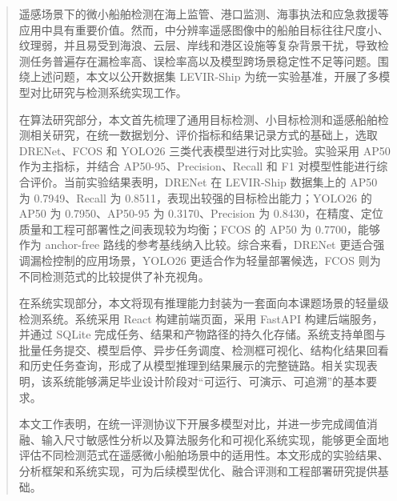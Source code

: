 

\begin{abstract}
  遥感场景下的微小船舶检测在海上监管、港口监测、海事执法和应急救援等应用中具有重要价值。然而，中分辨率遥感图像中的船舶目标往往尺度小、纹理弱，并且易受到海浪、云层、岸线和港区设施等复杂背景干扰，导致检测任务普遍存在漏检率高、误检率高以及模型跨场景稳定性不足等问题。围绕上述问题，本文以公开数据集 LEVIR-Ship 为统一实验基准，开展了多模型对比研究与检测系统实现工作。

  在算法研究部分，本文首先梳理了通用目标检测、小目标检测和遥感船舶检测相关研究，在统一数据划分、评价指标和结果记录方式的基础上，选取 DRENet、FCOS 和 YOLO26 三类代表模型进行对比实验。实验采用 AP50 作为主指标，并结合 AP50-95、Precision、Recall 和 F1 对模型性能进行综合评价。当前实验结果表明，DRENet 在 LEVIR-Ship 数据集上的 AP50 为 0.7949、Recall 为 0.8511，表现出较强的目标检出能力；YOLO26 的 AP50 为 0.7950、AP50-95 为 0.3170、Precision 为 0.8430，在精度、定位质量和工程可部署性之间表现较为均衡；FCOS 的 AP50 为 0.7700，能够作为 anchor-free 路线的参考基线纳入比较。综合来看，DRENet 更适合强调漏检控制的应用场景，YOLO26 更适合作为轻量部署候选，FCOS 则为不同检测范式的比较提供了补充视角。

  在系统实现部分，本文将现有推理能力封装为一套面向本课题场景的轻量级检测系统。系统采用 React 构建前端页面，采用 FastAPI 构建后端服务，并通过 SQLite 完成任务、结果和产物路径的持久化存储。系统支持单图与批量任务提交、模型启停、异步任务调度、检测框可视化、结构化结果回看和历史任务查询，形成了从模型推理到结果展示的完整链路。相关实现表明，该系统能够满足毕业设计阶段对“可运行、可演示、可追溯”的基本要求。

  本文工作表明，在统一评测协议下开展多模型对比，并进一步完成阈值消融、输入尺寸敏感性分析以及算法服务化和可视化系统实现，能够更全面地评估不同检测范式在遥感微小船舶场景中的适用性。本文形成的实验结果、分析框架和系统实现，可为后续模型优化、融合评测和工程部署研究提供基础。
\end{abstract}

